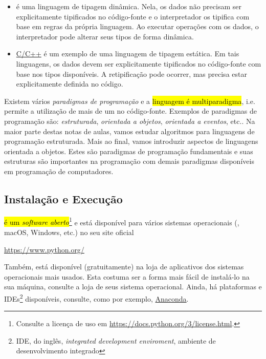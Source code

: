 \begin{itemize}
\item {}

  {\python} é uma linguagem de tipagem dinâmica. Nela, os dados não precisam ser explicitamente tipificados no código-fonte e o interpretador os tipifica com base em regras da própria linguagem. Ao executar operações com os dados, o interpretador pode alterar seus tipos de forma dinâmica.

\item {}

  \href{https://pt.wikipedia.org/wiki/C\%2B\%2B}{C/C++} é um exemplo de uma linguagem de tipagem estática. Em tais linguagens, os dados devem ser explicitamente tipificados no código-fonte com base nos tipos disponíveis. A retipificação pode ocorrer, mas precisa estar explicitamente definida no código.
\end{itemize}

Existem vários \emph{paradigmas de programação} e a \hl{linguagem {\python} é multiparadigma}, i.e. permite a utilização de mais de um no código-fonte. Exemplos de paradigmas de programação são: \emph{estruturada}, \emph{orientada a objetos}, \emph{orientada a eventos}, etc.. Na maior parte destas notas de aulas, vamos estudar algoritmos para linguagens de programação estruturada. Mais ao final, vamos introduzir aspectos de linguagens orientada a objetos. Estes são paradigmas de programação fundamentais e suas estruturas são importantes na programação com demais paradigmas disponíveis em programação de computadores.

\subsection{Instalação e Execução}

\hl{{\python} é um \emph{software aberto}}\footnote{Consulte a licença de uso em \url{https://docs.python.org/3/license.html}.} e está disponível para vários sistemas operacionais ({\linux}, macOS, Windows, etc.) no seu site oficial
\begin{center}
  \url{https://www.python.org/}
\end{center}
Também, está disponível (gratuitamente) na loja de aplicativos dos sistemas operacionais mais usados. Esta costuma ser a forma mais fácil de instalá-lo na sua máquina, consulte a loja de seus sistema operacional. Ainda, há plataformas e IDEs\footnote{IDE, do inglês, \textit{integrated development enviroment}, ambiente de desenvolvimento integrado} {\python} disponíveis, consulte, como por exemplo, \href{https://www.anaconda.com/}{Anaconda}.

